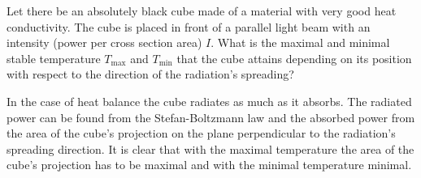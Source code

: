 Let there be an absolutely black cube made of a material with very good heat conductivity. The cube is placed in front of a parallel light beam with an intensity (power per cross section area) $I$. What is the maximal and minimal stable temperature $T_\text{max}$ and $T_\text{min}$ that the cube attains depending on its position with respect to the direction of the radiation’s spreading?

\hinteng
In the case of heat balance the cube radiates as much as it absorbs. The radiated power can be found from the Stefan-Boltzmann law and the absorbed power from the area of the cube’s projection on the plane perpendicular to the radiation’s spreading direction. It is clear that with the maximal temperature the area of the cube’s projection has to be maximal and with the minimal temperature minimal.

